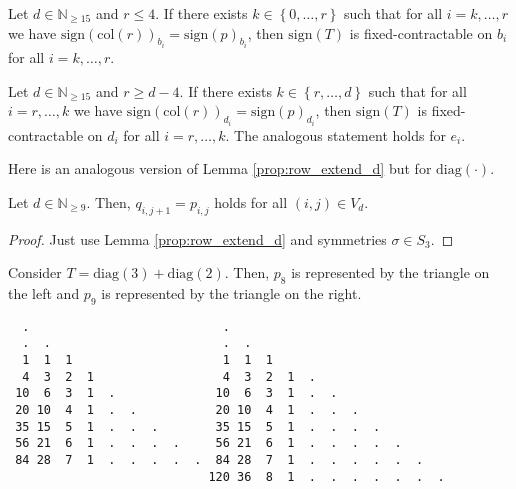 \begin{proposition}\label{prop:fixed-contraction-homo-col}
    Let \( d \in \mathbb{N}_{\geq 15} \) and \( r \leq 4 \). If there exists \( k \in \left\{ 0, \dots, r \right\} \) such that for all \( i = k, \dots, r\) we have \(  \mathrm{sign}(\mathrm{col}(r))_{b_i} = \mathrm{sign}(p)_{b_i} \),
    then  \( \mathrm{sign}(T) \) is fixed-contractable on \( b_i \) for all \( i = k, \dots, r \).
\end{proposition}

\begin{proposition}\label{prop:23e232sdada2kmkl}
    Let \( d \in \mathbb{N}_{\geq 15} \) and \( r \geq d-4 \). If there exists \( k \in \left\{ r, \dots, d \right\} \) such that for all \( i = r, \dots, k\) we have \(  \mathrm{sign}(\mathrm{col}(r))_{d_i} = \mathrm{sign}(p)_{d_i} \),
then  \( \mathrm{sign}(T) \) is fixed-contractable on \( d_i \) for all \( i = r, \dots, k\). The analogous statement holds for \( e_i \).
\end{proposition}

Here is an analogous version of Lemma \ref{prop:row_extend_d} but for \( \mathrm{diag}(\cdot) \).

\begin{lemma}\label{prop:diag_extend_d}
    Let \( d \in \mathbb{N}_{\geq 9} \). Then, \( q_{i,j+1} = p_{i,j} \) holds for all \( (i,j) \in V_d \).
\end{lemma}

\begin{proof}
    Just use Lemma \ref{prop:row_extend_d} and symmetries \( \sigma \in S_3 \).
\end{proof}

\begin{example}
    Consider \( T = \mathrm{diag}(3) + \mathrm{diag}(2) \). Then, \( p_8 \) is represented by the triangle on the left and \( p_9 \) is represented by the triangle on the right.
    \begin{verbatim}
  .                           .  
  .  .                        .  .  
  1  1  1                     1  1  1   
  4  3  2  1                  4  3  2  1  .
 10  6  3  1  .              10  6  3  1  .  .
 20 10  4  1  .  .           20 10  4  1  .  .  .
 35 15  5  1  .  .  .        35 15  5  1  .  .  .  .
 56 21  6  1  .  .  .  .     56 21  6  1  .  .  .  .  .
 84 28  7  1  .  .  .  .  .  84 28  7  1  .  .  .  .  .  .
                            120 36  8  1  .  .  .  .  .  .  . 
\end{verbatim}
\end{example}

